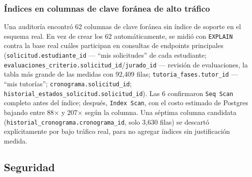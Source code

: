 \subsubsection{Índices en columnas de clave foránea de alto tráfico}
Una auditoría encontró 62 columnas de clave foránea sin índice de soporte en el esquema real. En vez de
crear los 62 automáticamente, se midió con \texttt{EXPLAIN} contra la base real cuáles participan en
consultas de endpoints principales (\texttt{solicitud.estudiante\_id} --- ``mis solicitudes'' de cada
estudiante; \texttt{evaluaciones\_criterio.solicitud\_id}/\texttt{jurado\_id} --- revisión de
evaluaciones, la tabla más grande de las medidas con 92,409 filas; \texttt{tutoria\_fases.tutor\_id} ---
``mis tutorías''; \texttt{cronograma.solicitud\_id}; \texttt{historial\_estados\_solicitud.solicitud\_id}).
Las 6 confirmaron \texttt{Seq Scan} completo antes del índice; después, \texttt{Index Scan}, con el costo
estimado de Postgres bajando entre 88$\times$ y 207$\times$ según la columna. Una séptima columna
candidata (\texttt{historial\_cronograma.cronograma\_id}, solo 3,630 filas) se descartó explícitamente
por bajo tráfico real, para no agregar índices sin justificación medida.

\subsection{Seguridad}

